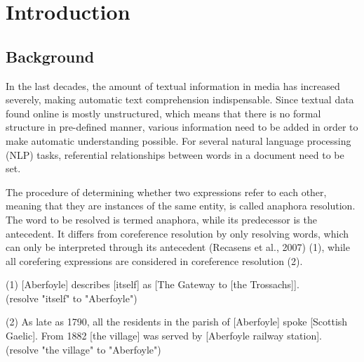 \chapter{Introduction}
\label{sec:Introduction}

\section{Background}

In the last decades, the amount of textual information in media has increased severely, making automatic text comprehension indispensable. Since textual data found online is mostly unstructured, which means that there is no formal structure in pre-defined manner, various information need to be added in order to make automatic understanding possible. For several natural language processing (NLP) tasks, referential relationships between words  in a document need to be set. 

The procedure of determining whether two expressions  refer to each other, meaning that they are instances of the same entity, is called anaphora resolution. The word to be resolved is termed anaphora, while its predecessor is the antecedent. It differs from coreference resolution by only resolving words, which can only be interpreted through its antecedent (Recasens et al., 2007) (1), while all corefering expressions are considered in coreference resolution (2).

(1) [Aberfoyle] describes [itself] as [The Gateway to [the Trossachs]]. \\
(resolve "itself" to "Aberfoyle")

(2) As late as 1790, all the residents in the parish of [Aberfoyle] spoke [Scottish Gaelic]. From 1882 [the village] was served by [Aberfoyle railway station].\\
(resolve "the village"  to "Aberfoyle")


